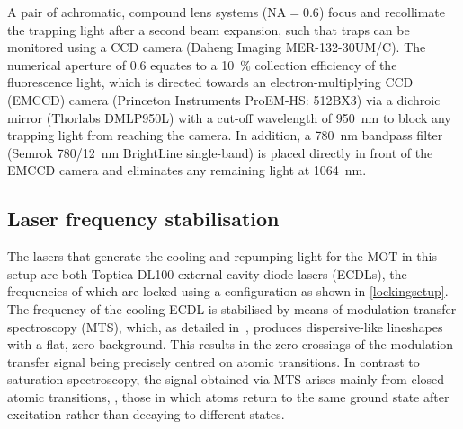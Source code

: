 \documentclass[../Thesis-IJspeert.tex]{subfiles}
\begin{document}
A pair of achromatic, compound lens systems ($\mathrm{NA} = 0.6$) focus and recollimate the trapping light after a second beam expansion, such that traps can be monitored using a CCD camera (Daheng Imaging MER-132-30UM/C). The numerical aperture of \num{0.6} equates to a \SI{10}{\percent} collection efficiency of the fluorescence light, which is directed towards an electron-multiplying CCD (EMCCD) camera (Princeton Instruments ProEM-HS: 512BX3) via a dichroic mirror (Thorlabs DMLP950L) with a cut-off wavelength of \SI{950}{\nano\meter} to block any trapping light from reaching the camera. In addition, a \SI{780}{\nano\meter} bandpass filter (Semrok \num{780}/\SI{12}{\nano\meter} BrightLine single-band) is placed directly in front of the EMCCD camera and eliminates any remaining light at \SI{1064}{\nano\meter}.

\subsection{Laser frequency stabilisation}
The lasers that generate the cooling and repumping light for the MOT in this setup are both Toptica DL100 external cavity diode lasers (ECDLs), the frequencies of which are locked using a configuration as shown in \autoref{lockingsetup}. The frequency of the cooling ECDL is stabilised by means of modulation transfer spectroscopy (MTS), which, as detailed in~\cite{McCarron2008}, produces dispersive-like lineshapes with a flat, zero background. This results in the zero-crossings of the modulation transfer signal being precisely centred on atomic transitions. In contrast to saturation spectroscopy, the signal obtained via MTS arises mainly from closed atomic transitions, \ie, those in which atoms return to the same ground state after excitation rather than decaying to different states.
\end{document}
